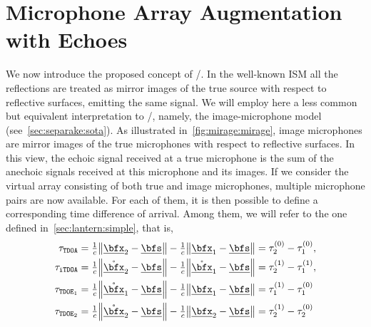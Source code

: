 \section{Microphone Array Augmentation with Echoes}\label{sec:mirage:mirage}
We now introduce the proposed concept of \MIRAGEdef/.
In the well-known \acf{ISM} all the reflections are treated as mirror images of the true source with respect to reflective surfaces, emitting the same signal.
We will employ here a less common but equivalent interpretation to \ISM/, namely, the image-microphone model (see~\cref{sec:separake:sota}).
As illustrated in~\cref{fig:mirage:mirage}, image microphones are mirror images of the true microphones with respect to reflective surfaces.
In this view, the echoic signal received at a true microphone is the sum of the anechoic signals received at this microphone and its images.
If we consider the virtual array consisting of both true and image microphones, multiple microphone pairs are now available.
For each of them, it is then possible to define a corresponding time difference of arrival.
Among them, we will refer to the one defined in~\cref{sec:lantern:simple}, that is,
\begin{equation}
    \begin{aligned}
        \tau_\mathtt{TDOA}  &= \tfrac{1}{c} \norm{\positionMicrophone_2 - \positionSource} - \tfrac{1}{c} \norm{\positionMicrophone_1 - \positionSource} = \tau_2^{(0)} - \tau_1^{(0)},\\
        \tau_\mathtt{iTDOA} &= \tfrac{1}{c} \norm{\mathring{\positionMicrophone}_2 - \positionSource} - \tfrac{1}{c} \norm{\mathring{\positionMicrophone}_1 - \positionSource} = \tau_2^{(1)} - \tau_1^{(1)},\\
        \tau_{\mathtt{TDOE}_1}  &= \tfrac{1}{c} \norm{\mathring{\positionMicrophone}_1 - \positionSource} - \tfrac{1}{c} \norm{\positionMicrophone_1 - \positionSource} = \tau_1^{(1)} - \tau_1^{(0)}\\
        \tau_{\mathtt{TDOE}_2}  &= \tfrac{1}{c} \norm{\mathring{\positionMicrophone}_2 - \positionSource} - \tfrac{1}{c} \norm{\positionMicrophone_2 - \positionSource} = \tau_2^{(1)} - \tau_2^{(0)}
    \end{aligned}
\end{equation}
